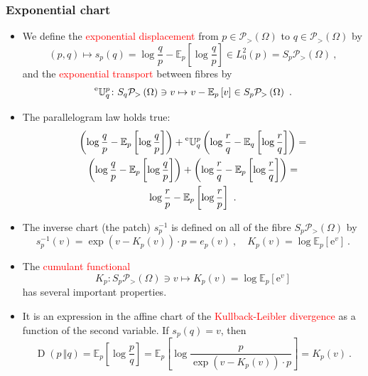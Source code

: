 \documentclass[xcolor=svgnames]{beamer}
\newcommand{\KL}[2]{\operatorname{D}\left(#1\,\Vert#2\right)}
\newcommand{\etransport}[2]{\prescript{\text{e}}{} {\mathbb U} _ {#1} ^ {#2}}
\newcommand{\euler}{\mathrm{e}}
\newcommand{\expectat}[2]{\mathbb E_{#1}\left[#2\right]}
\newcommand{\expfibreat}[2]{S_{#1}#2}
\newcommand{\expof}[1]{\exp\left(#1\right)}
\newcommand{\opensimplexon}[1]{\mathcal P_>\left(#1\right)}
\newcommand{\rosso}[1]{\textcolor{red}{#1}}
\renewcommand{\emph}{\rosso}
\begin{document}
\begin{frame}\small\frametitle{Exponential chart}

  \begin{itemize}

   \item We define the \emph{exponential displacement} from $p \in \opensimplexon \Omega$ to $q \in \opensimplexon \Omega$ by
    \begin{equation*}
(p,q) \mapsto s_p(q) = \log \frac q  p - \expectat p {\log \frac q p} \in L^2_0(p) = \expfibreat p {\opensimplexon \Omega} \ ,
    \end{equation*}
    and the \emph{exponential transport} between fibres  by
    \begin{equation*}
      \etransport q p \colon \expfibreat q {\opensimplexon \Omega} \ni v \mapsto v - \expectat p v \in \expfibreat p {\opensimplexon \Omega} \ .
    \end{equation*}
\item The parallelogram law holds true:
    \begin{multline*}
      \left(\log \frac q p - \expectat p {\log \frac q p}\right) + \etransport q p \left(\log \frac r q - \expectat q {\log \frac r q}\right) = \\   \left(\log \frac q p - \expectat p {\log \frac q p}\right) + \left(\log \frac r q - \expectat p {\log \frac r q}\right) = \\ \log \frac r p - \expectat p {\log \frac r p} \ . 
    \end{multline*}
\item The inverse chart (the patch) $s_p^{-1}$ is defined on all of the fibre $\expfibreat p {\opensimplexon \Omega}$ by
  \begin{equation*}
    s^{-1}_p(v) = \expof{v - K_p(v)} \cdot p = e_p(v) \ , \quad K_p(v) = \log \expectat p {\euler^v} \ .
  \end{equation*}
\item The \emph{cumulant functional}
\begin{equation*}
   K_p \colon \expfibreat p {\opensimplexon \Omega} \ni v \mapsto K_p(v) = \log \expectat p {\euler^v}
 \end{equation*}
 has several important properties.
 \item It is an expression in the affine chart of the \emph{Kullback-Leibler divergence} as a function of the second variable. If $s_p(q) = v$, then
\begin{equation*}
    \KL p q = \expectat p {\log \frac p q} = \expectat p {\log \frac p {\expof{v - K_p(v)} \cdot p}} = K_p(v) \ .
\end{equation*}
\end{itemize}
\end{frame}
\end{document}
